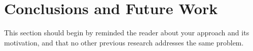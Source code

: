 \section{Conclusions and Future Work}
\label{sec:conclusions-and-future-work}

This section should begin by reminded the reader
about your approach and its motivation, and that
no other previous research addresses the same
problem.